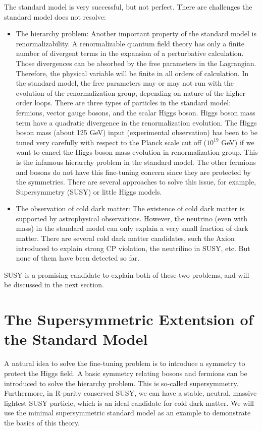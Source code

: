 The standard model is very successful, but not perfect. There are challenges the standard model does not resolve:
\begin{itemize}
\item The hierarchy problem: Another important property of the standard model is renormalizability. A renormalizable quantum field theory has only a finite number of divergent terms in the expansion of a perturbative calculation. Those divergences can be absorbed by the free parameters in the Lagrangian. Therefore, the physical variable will be finite in all orders of calculation. In the standard model, the free parameters may or may not run with the evolution of the renormalization group, depending on nature of the higher-order loops. There are three types of particles in the standard model: fermions, vector gauge bosons, and the scalar Higgs boson. Higgs boson mass term have a quadratic divergence in the renormalization evolution. The Higgs boson mass (about 125 GeV) input (experimental observation) has been to be tuned very carefully with respect to the Planck scale cut off ($10^{19}$ GeV) if we want to cancel the Higgs boson mass evolution in renormalization group. This is the infamous hierarchy problem in the standard model. The other fermions and bosons do not have this fine-tuning concern since they are protected by the symmetries. There are several approaches to solve this issue, for example, Supersymmetry (SUSY) or little Higgs models\cite{Schmaltz:2005ky}. 
\item The observation of cold dark matter: The existence of cold dark matter is supported by astrophysical observations. However, the neutrino (even with mass) in the standard model can only explain a very small fraction of dark matter. There are several cold dark matter candidates, such the Axion introduced to explain strong CP violation, the neutrilino in SUSY, etc. But none of them have been detected so far.
\end{itemize}

SUSY is a promising candidate to explain both of these two problems, and will be discussed in the next section. 

\clearpage
\section{The Supersymmetric Extentsion of the Standard Model}
A natural idea to solve the fine-tuning problem is to introduce a symmetry to protect the Higgs field. A basic symmetry relating bosons and fermions can be introduced to solve the hierarchy problem. This is so-called supersymmetry. Furthermore, in R-parity conserved SUSY\cite{}, we can have a stable, neutral, massive lightest SUSY particle, which is an ideal candidate for cold dark matter. We will use the minimal supersymmetric standard model as an example to demonstrate the basics of this theory. 

